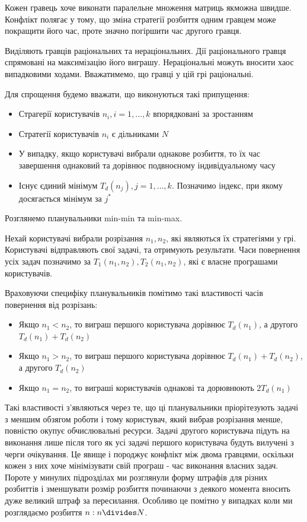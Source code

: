 Кожен гравець хоче виконати паралельне множення матриць якможна швидше. Конфлікт полягає у тому, що зміна стратегії розбиття одним гравцем може покращити його час, проте значно погіршити час другого гравця.

Виділяють гравців раціональних та нераціональних. Дії раціонального гравця спрямовані на максимізацію його виграшу. Нераціональні можуть вносити хаос випадковими ходами. Вважатимемо, що гравці у цій грі раціональні.

Для спрощення будемо вважати, що виконуються такі припущення:
\begin{itemize}
	\item Страгерії користувачів $n_i, i=1,\ldots,k$ впорядковані за зростанням
	\item Стратегії користувачів $n_i$ є дільниками $N$
	\item У випадку, якщо користувачі вибрали однакове розбиття, то їх час завершення однаковий та дорівнює подвноєному індивідуальному часу
	\item Існує єдиний мінімум $T_d(n_j), j=1,\ldots,k$. Позначимо індекс, при якому досягається мінімум за $j^*$
\end{itemize}

Розглянемо планувальники min-min та min-max.

Нехай користувачі вибрали розрізання $n_1,n_2$, які являються їх стратегіями у грі. Користувачі відправляють свої задачі, та отримують результати. Часи повернення усіх задач позначимо за $T_1(n_1,n_2),T_2(n_1,n_2)$, які є власне програшами користувачів.

Враховуючи специфіку планувальників помітимо такі властивості часів повернення від розрізань:
\begin{itemize}
	\item Якщо $n_1 < n_2$, то виграш першого користувача дорівнює $T_d(n_1)$, а другого $T_d(n_1) + T_d(n_2)$
	\item Якщо $n_1 > n_2$, то виграш першого користувача дорівнює $T_d(n_1) + T_d(n_2)$, а другого $T_d(n_2)$
	\item Якщо $n_1 = n_2$, то виграші користувачів однакові та дорювнюють $2T_d(n_1)$
\end{itemize}

Такі властивості з'являються через те, що ці планувальники пріорітезують задачі з меншим обзягом роботи і тому користувач, який вибрав розрізання менше, повністю окупує обчислювальні ресурси. Задачі другого користувача підуть на виконання лише після того як усі задачі першого користувача будуть вилучені з черги очікування. Це явище і породжує конфлікт між двома гравцями, оскільки кожен з них хоче мінімізувати свій програш - час виконання власних задач. Пороте у минулих підрозділах ми розглянули форму штрафів для різних розбиттів і зменшувати розмір розбиття починаючи з деякого момента вносить дуже великий штраф за пересилання. Особливо це помітно у випадках коли ми розглядаємо розбиття $n: n \divides N$.

